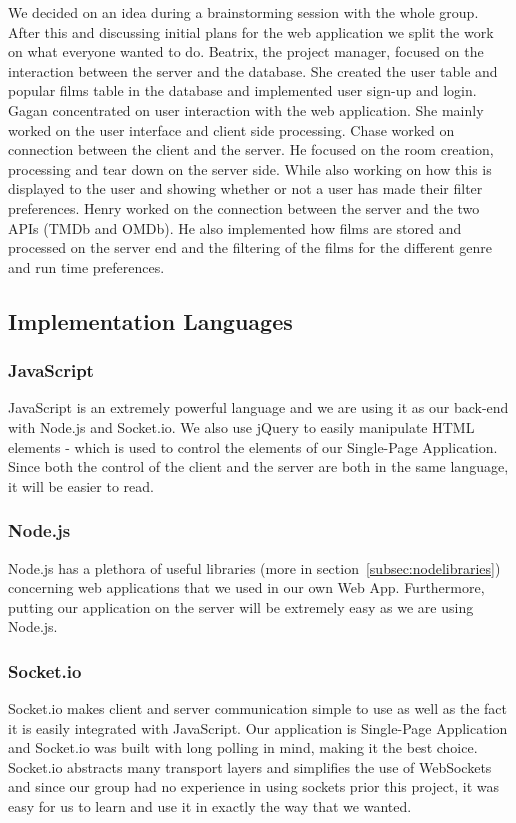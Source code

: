 \documentclass{article}
\begin{document}
We decided on an idea during a brainstorming session with the whole group. After this and discussing initial plans for the web application we split the work on what everyone wanted to do. Beatrix, the project manager, focused on the interaction between the server and the database. She created the user table and popular films table in the database and implemented user sign-up and login. Gagan concentrated on user interaction with the web application. She mainly worked on the user interface and client side processing. Chase worked on connection between the client and the server. He focused on the room creation, processing and tear down on the server side. While also working on how this is displayed to the user and showing whether or not a user has made their filter preferences. Henry worked on the connection between the server and the two APIs (TMDb and OMDb). He also implemented how films are stored and processed on the server end and the filtering of the films for the different genre and run time preferences.
\subsection{Implementation Languages}

\subsubsection{JavaScript}
JavaScript is an extremely powerful language and we are using it as our back-end with Node.js and Socket.io. We also use jQuery to easily manipulate HTML elements - which is used to control the elements of our Single-Page Application. Since both the control of the client and the server are both in the same language, it will be easier to read. 

\subsubsection{Node.js}
Node.js has a plethora of useful libraries (more in section~\ref{subsec:nodelibraries}) concerning web applications that we used in our own Web App. Furthermore, putting our application on the server will be extremely easy as we are using Node.js.

\subsubsection{Socket.io}
Socket.io makes client and server communication simple to use as well as the fact it is easily integrated with JavaScript. Our application is Single-Page Application and Socket.io was built with long polling in mind, making it the best choice. Socket.io abstracts many transport layers and simplifies the use of WebSockets and since our group had no experience in using sockets prior this project, it was easy for us to learn and use it in exactly the way that we wanted. 
\end{document}
